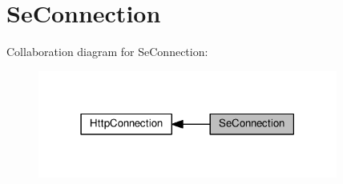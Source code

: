 \hypertarget{group__se__connection}{}\section{Se\+Connection}
\label{group__se__connection}
Collaboration diagram for Se\+Connection\+:\nopagebreak
\begin{figure}[H]
\begin{center}
\leavevmode
\includegraphics[width=279pt]{group__se__connection}
\end{center}
\end{figure}
